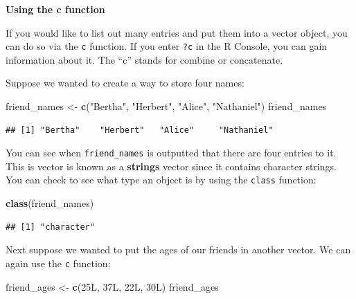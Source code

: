 \documentclass[]{tufte-book}
\newenvironment{Shaded}{\begin{snugshade}}{\end{snugshade}}
\newcommand{\KeywordTok}[1]{\textcolor[rgb]{0.13,0.29,0.53}{\textbf{{#1}}}}
\newcommand{\StringTok}[1]{\textcolor[rgb]{0.31,0.60,0.02}{{#1}}}
\newcommand{\NormalTok}[1]{{#1}}
\begin{document}
\vspace*{0.2in}

\noindent\textbf{Using the c function}\vspace*{0.1in}

If you would like to list out many entries and put them into a vector
object, you can do so via the \texttt{c} function. If you enter
\texttt{?c} in the R Console, you can gain information about it. The
``c'' stands for combine or concatenate.

Suppose we wanted to create a way to store four names:

\begin{Shaded}
\begin{Highlighting}[]
\NormalTok{friend_names <-}\StringTok{ }\KeywordTok{c}\NormalTok{(}\StringTok{"Bertha"}\NormalTok{, }\StringTok{"Herbert"}\NormalTok{, }\StringTok{"Alice"}\NormalTok{, }\StringTok{"Nathaniel"}\NormalTok{)}
\NormalTok{friend_names}
\end{Highlighting}
\end{Shaded}

\begin{verbatim}
## [1] "Bertha"    "Herbert"   "Alice"     "Nathaniel"
\end{verbatim}

You can see when \texttt{friend\_names} is outputted that there are four
entries to it. This is vector is known as a \textbf{strings} vector
since it contains character strings. You can check to see what type an
object is by using the \texttt{class} function:

\begin{Shaded}
\begin{Highlighting}[]
\KeywordTok{class}\NormalTok{(friend_names)}
\end{Highlighting}
\end{Shaded}

\begin{verbatim}
## [1] "character"
\end{verbatim}

Next suppose we wanted to put the ages of our friends in another vector.
We can again use the \texttt{c} function:

\begin{Shaded}
\begin{Highlighting}[]
\NormalTok{friend_ages <-}\StringTok{ }\KeywordTok{c}\NormalTok{(25L, 37L, 22L, 30L)}
\NormalTok{friend_ages}
\end{Highlighting}
\end{Shaded}
\end{document}
